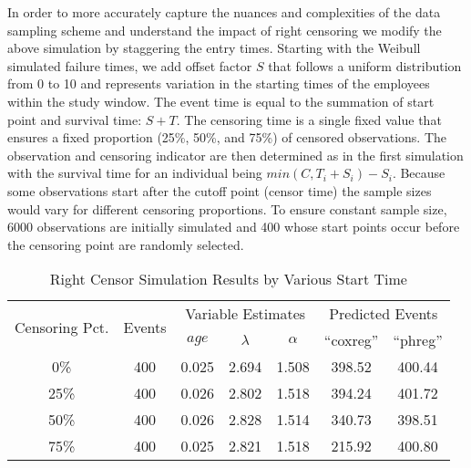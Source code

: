 \documentclass[12pt,letterpaper]{article}
\begin{document}
In order to more accurately capture the nuances and complexities of the data sampling scheme and understand the impact of right censoring we modify the above simulation by staggering the entry times.  Starting with the Weibull simulated failure times, we add offset factor $S$ that follows a uniform distribution from 0 to 10 and represents variation in the starting times of the employees within the study window. The event time is equal to the summation of start point and survival time: $S+T$. The censoring time is a single fixed value that ensures a fixed proportion (25\%, 50\%, and 75\%) of censored observations.  The observation and censoring indicator are then determined as in the first simulation with the survival time for an individual being $min(C,T_i+S_i) - S_i$. Because some observations start after the cutoff point (censor time) the sample sizes would vary for different censoring proportions.  To ensure constant sample size, 6000 observations are initially simulated and 400 whose start points occur before the censoring point are randomly selected.
 \begin{table}[htbp]
 	\renewcommand{\arraystretch}{1.5}
 	\scriptsize %
 	\centering
 	\caption{Right Censor Simulation Results by Various Start Time}
 	\begin{tabular}{ccccccc}
 		\toprule
 		\multicolumn{1}{c}{\multirow{2}{1.5cm}{Censoring Pct.}}  & \multirow{2}[4]{*}{Events} & \multicolumn{3}{c}{Variable Estimates} & \multicolumn{2}{c}{Predicted Events} \\ \cline{3-7}
 		&       & $age$   & $\lambda$ & $\alpha$ &\enquote{coxreg} & \enquote{phreg}\\
 		\midrule
 		0\%   & 400   & 0.025 & 2.694 & 1.508 & 398.52 & 400.44 \\
 		25\%  & 400   & 0.026 & 2.802 & 1.518 & 394.24 & 401.72 \\
 		50\%  & 400   & 0.026 & 2.828 & 1.514 & 340.73 & 398.51 \\
 		75\%  & 400   & 0.025 & 2.821 & 1.518 & 215.92 & 400.80 \\
 		\bottomrule
 	\end{tabular}%
 	\label{tab:right2}%
 \end{table}%
\end{document}
